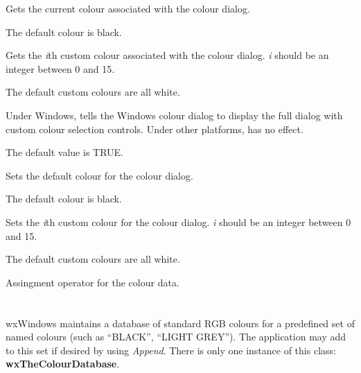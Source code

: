 
Gets the current colour associated with the colour dialog.

The default colour is black.

\label{wxcolourdatagetcustomcolour}


Gets the {\it i}th custom colour associated with the colour dialog. {\it i} should
be an integer between 0 and 15.

The default custom colours are all white.

\label{wxcolourdatasetchoosefull}


Under Windows, tells the Windows colour dialog to display the full dialog
with custom colour selection controls. Under other platforms, has no effect.

The default value is TRUE.

\label{wxcolourdatasetcolour}


Sets the default colour for the colour dialog.

The default colour is black.

\label{wxcolourdatasetcustomcolour}


Sets the {\it i}th custom colour for the colour dialog. {\it i} should
be an integer between 0 and 15.

The default custom colours are all white.

\label{wxcolourdataassign}


Assingment operator for the colour data.

\section{}\label{wxcolourdatabase}

wxWindows maintains a database of standard RGB colours for a predefined
set of named colours (such as ``BLACK'', ``LIGHT GREY''). The
application may add to this set if desired by using {\it Append}.  There
is only one instance of this class: {\bf wxTheColourDatabase}.

